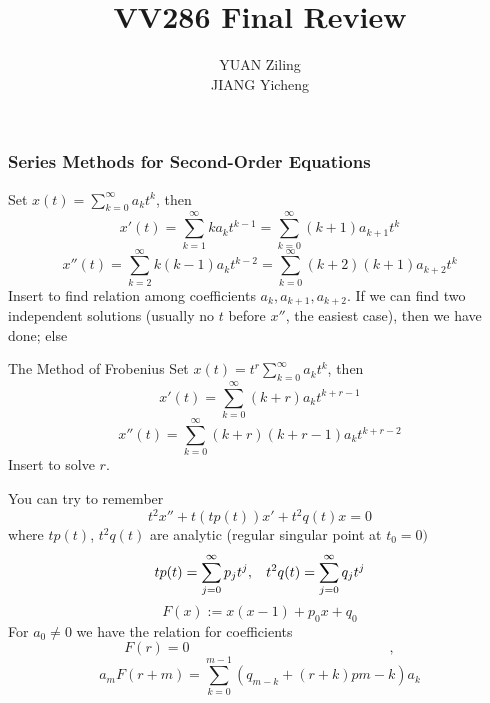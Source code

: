 \documentclass{beamer}
\title{\textcolor[rgb]{0,0.168,0.376}{VV286 Final Review}}
\author{YUAN Ziling\\JIANG Yicheng}
\begin{document}
\begin{frame}
\titlepage
\end{frame}




\begin{frame}
\frametitle{Series Methods for Second-Order Equations}
Set $x(t)=\sum\limits_{k=0}^{\infty}a_kt^k$, then
$$x'(t)=\sum\limits_{k=1}^{\infty}ka_kt^{k-1}=\sum\limits_{k=0}^{\infty}(k+1)a_{k+1}t^{k}$$
$$x''(t)=\sum\limits_{k=2}^{\infty}k(k-1)a_kt^{k-2}=\sum\limits_{k=0}^{\infty}(k+2)(k+1)a_{k+2}t^{k}$$
Insert to find relation among coefficients $a_k,a_{k+1},a_{k+2}$. If we can find two independent solutions (usually no $t$ before $x''$, the easiest case), then we have done; else

\end{frame}
\begin{frame}
\begin{block}{The Method of Frobenius}
Set $x(t)=t^r\sum\limits_{k=0}^{\infty}a_kt^k$, then
$$x'(t)=\sum\limits_{k=0}^{\infty}(k+r)a_kt^{k+r-1}$$
$$x''(t)=\sum\limits_{k=0}^{\infty}(k+r)(k+r-1)a_kt^{k+r-2}$$
Insert to solve $r$.
\end{block}
\end{frame}

\begin{frame}
\begin{block}{You can try to remember}
$$t^2x''+ t(tp(t))x'+ t^2q(t)x = 0$$
where $tp(t)$, $t^2q(t)$ are analytic (regular singular point at $t_0=0)$
$$tp(t)=\sum\limits_{j=0}^{\infty}p_j t^j,\hspace{3mm} t^2q(t)=\sum\limits_{j=0}^{\infty}q_j t^j$$
$$F(x) := x(x - 1) + p_0x + q_0$$
For $a_0 \neq 0$ we have the relation for coefficients
$$F(r ) = 0\hspace{6cm},$$
$$a_mF(r + m) = \sum\limits_{k=0}^{m-1}(q_{m-k} + (r + k)p{m-k} )a_k $$
\end{block}
\end{frame}
\end{document}
